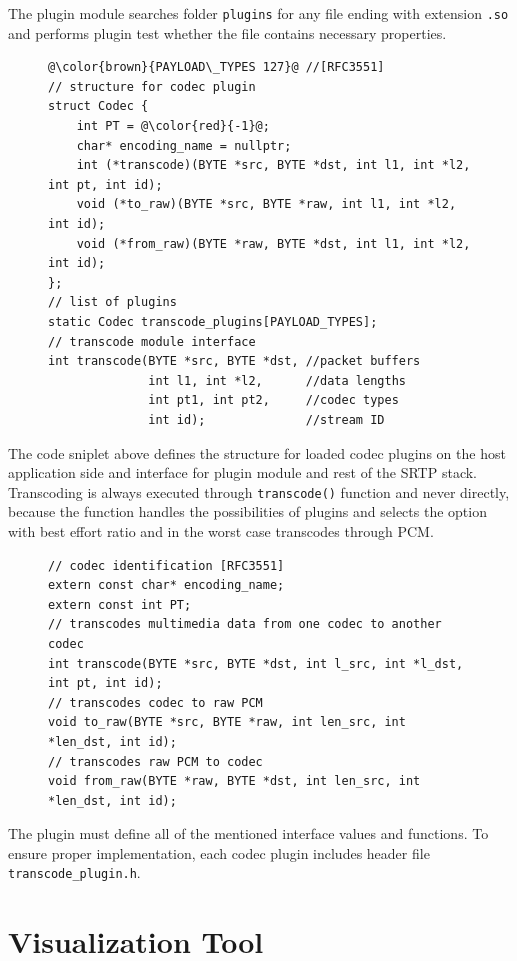 The plugin module searches folder \texttt{plugins} for any file ending with 
extension \texttt{.so} and performs plugin test whether the file contains
necessary properties.

\begin{figure}[H]
\begin{lstlisting}
@\color{brown}{PAYLOAD\_TYPES 127}@ //[RFC3551]
// structure for codec plugin
struct Codec {
    int PT = @\color{red}{-1}@;
    char* encoding_name = nullptr;
    int (*transcode)(BYTE *src, BYTE *dst, int l1, int *l2, int pt, int id);
    void (*to_raw)(BYTE *src, BYTE *raw, int l1, int *l2, int id);
    void (*from_raw)(BYTE *raw, BYTE *dst, int l1, int *l2, int id);
};
// list of plugins
static Codec transcode_plugins[PAYLOAD_TYPES];
// transcode module interface
int transcode(BYTE *src, BYTE *dst, //packet buffers 
              int l1, int *l2,      //data lengths
              int pt1, int pt2,     //codec types
              int id);              //stream ID
\end{lstlisting}
\end{figure}

The code sniplet above defines the structure for loaded codec plugins on the 
host application side and interface for plugin module and rest of the SRTP 
stack. Transcoding is always executed through \texttt{transcode()} function and
never directly, because the function handles the possibilities of plugins
and selects the option with best effort ratio and in the worst case transcodes
through PCM.

\begin{figure}[H]
\begin{lstlisting}
// codec identification [RFC3551]
extern const char* encoding_name;
extern const int PT;
// transcodes multimedia data from one codec to another codec
int transcode(BYTE *src, BYTE *dst, int l_src, int *l_dst, int pt, int id);
// transcodes codec to raw PCM
void to_raw(BYTE *src, BYTE *raw, int len_src, int *len_dst, int id);
// transcodes raw PCM to codec
void from_raw(BYTE *raw, BYTE *dst, int len_src, int *len_dst, int id);
\end{lstlisting}
\end{figure}

The plugin must define all of the mentioned interface values and functions.
To ensure proper implementation, each codec plugin includes header file 
\texttt{transcode\_plugin.h}.


\section{Visualization Tool}






